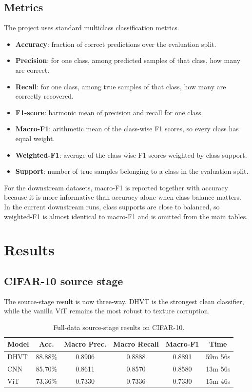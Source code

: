 \documentclass[11pt]{article}
\begin{document}
\subsection{Metrics}
The project uses standard multiclass classification metrics.
\begin{itemize}
    \item \textbf{Accuracy}: fraction of correct predictions over the evaluation split.
    \item \textbf{Precision}: for one class, among predicted samples of that class, how many are correct.
    \item \textbf{Recall}: for one class, among true samples of that class, how many are correctly recovered.
    \item \textbf{F1-score}: harmonic mean of precision and recall for one class.
    \item \textbf{Macro-F1}: arithmetic mean of the class-wise F1 scores, so every class has equal weight.
    \item \textbf{Weighted-F1}: average of the class-wise F1 scores weighted by class support.
    \item \textbf{Support}: number of true samples belonging to a class in the evaluation split.
\end{itemize}

For the downstream datasets, macro-F1 is reported together with accuracy because it is more informative than accuracy alone when class balance matters. In the current downstream runs, class supports are close to balanced, so weighted-F1 is almost identical to macro-F1 and is omitted from the main tables.

\section{Results}
\subsection{CIFAR-10 source stage}
The source-stage result is now three-way. DHVT is the strongest clean classifier, while the vanilla ViT remains the most robust to texture corruption.

\begin{table}[H]
\centering
\caption{Full-data source-stage results on CIFAR-10.}
\begin{tabular}{lccccc}
\toprule
Model & Acc. & Macro Prec. & Macro Recall & Macro-F1 & Time \\
\midrule
DHVT & 88.88\% & 0.8906 & 0.8888 & 0.8891 & 59m 56s \\
CNN & 85.70\% & 0.8611 & 0.8570 & 0.8580 & 13m 56s \\
ViT & 73.36\% & 0.7330 & 0.7336 & 0.7330 & 15m 46s \\
\bottomrule
\end{tabular}
\end{table}
\end{document}
